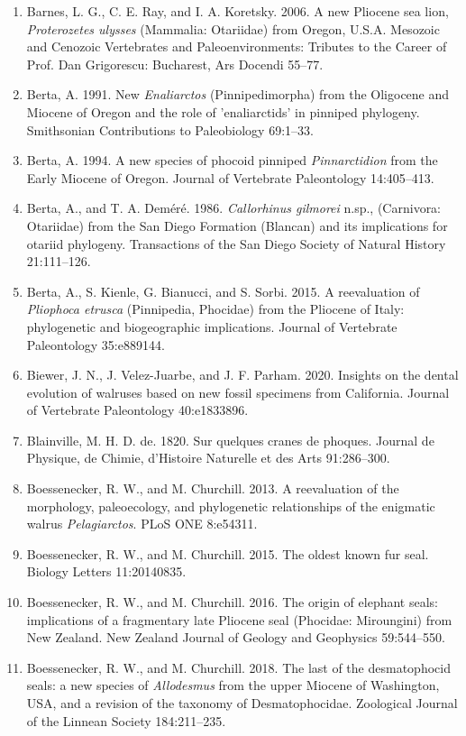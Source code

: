 \documentclass[a4paper, 12pt]{article}
\begin{document}
\begin{enumerate}
\item Barnes, L. G., C. E. Ray, and I. A. Koretsky. 2006. A new Pliocene sea lion, \textit{Proterozetes ulysses} (Mammalia: Otariidae) from Oregon, U.S.A. Mesozoic and Cenozoic Vertebrates and Paleoenvironments: Tributes to the Career of Prof. Dan Grigorescu: Bucharest, Ars Docendi 55–77.
\item Berta, A. 1991. New \textit{Enaliarctos} (Pinnipedimorpha) from the Oligocene and Miocene of Oregon and the role of 'enaliarctids' in pinniped phylogeny. Smithsonian Contributions to Paleobiology 69:1–33.
\item Berta, A. 1994. A new species of phocoid pinniped \textit{Pinnarctidion} from the Early Miocene of Oregon. Journal of Vertebrate Paleontology 14:405–413.
\item Berta, A., and T. A. Dem\'{e}r\'{e}. 1986. \textit{Callorhinus gilmorei} n.sp., (Carnivora: Otariidae) from the San Diego Formation (Blancan) and its implications for otariid phylogeny. Transactions of the San Diego Society of Natural History 21:111–126.
\item Berta, A., S. Kienle, G. Bianucci, and S. Sorbi. 2015. A reevaluation of \textit{Pliophoca etrusca} (Pinnipedia, Phocidae) from the Pliocene of Italy: phylogenetic and biogeographic implications. Journal of Vertebrate Paleontology 35:e889144.
\item Biewer, J. N., J. Velez-Juarbe, and J. F. Parham. 2020. Insights on the dental evolution of walruses based on new fossil specimens from California. Journal of Vertebrate Paleontology 40:e1833896.
\item Blainville, M. H. D. de. 1820. Sur quelques cranes de phoques. Journal de Physique, de Chimie, d'Histoire Naturelle et des Arts 91:286–300.
\item Boessenecker, R. W., and M. Churchill. 2013. A reevaluation of the morphology, paleoecology, and phylogenetic relationships of the enigmatic walrus \textit{Pelagiarctos}. PLoS ONE 8:e54311.
\item Boessenecker, R. W., and M. Churchill. 2015. The oldest known fur seal. Biology Letters 11:20140835.
\item Boessenecker, R. W., and M. Churchill. 2016. The origin of elephant seals: implications of a fragmentary late Pliocene seal (Phocidae: Miroungini) from New Zealand. New Zealand Journal of Geology and Geophysics 59:544–550.
\item Boessenecker, R. W., and M. Churchill. 2018. The last of the desmatophocid seals: a new species of \textit{Allodesmus} from the upper Miocene of Washington, USA, and a revision of the taxonomy of Desmatophocidae. Zoological Journal of the Linnean Society 184:211–235.

\end{enumerate}
\end{document}
